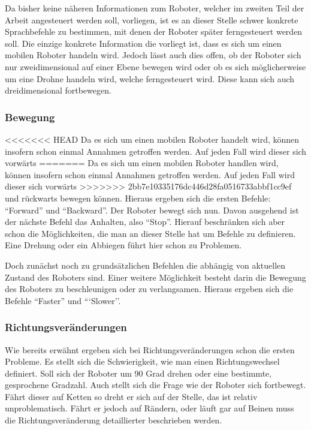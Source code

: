 Da bisher keine n\"aheren Informationen zum Roboter, welcher im zweiten Teil der Arbeit angesteuert werden soll, vorliegen, ist es an dieser Stelle schwer 
konkrete Sprachbefehle zu bestimmen, mit denen der Roboter sp\"ater ferngesteuert werden soll.
Die einzige konkrete Information die vorliegt ist, dass es sich um einen mobilen Roboter handeln wird. 
Jedoch l\"asst auch dies offen, ob der Roboter sich nur zweidimensional auf einer Ebene bewegen wird oder ob es sich m\"oglicherweise um eine Drohne 
handeln wird, welche ferngesteuert wird. Diese kann sich auch dreidimensional fortbewegen.
\par\smallskip 

\subsubsection{Bewegung}

<<<<<<< HEAD
Da es sich um einen mobilen Roboter handelt wird, k\"onnen insofern schon einmal Annahmen getroffen werden. Auf jeden Fall wird dieser sich vorw\"arts 
=======
Da es sich um einen mobilen Roboter handlen wird, k\"onnen insofern schon einmal Annahmen getroffen werden. Auf jeden Fall wird dieser sich vorw\"arts 
>>>>>>> 2bb7e10335176dc446d28fa0516733abbf1cc9ef
und r\"uckwarts bewegen k\"onnen. Hieraus ergeben sich die ersten Befehle: ``Forward'' und ``Backward''. Der Roboter bewegt sich nun. Davon ausgehend 
ist der n\"achste Befehl das Anhalten, also ``Stop''. Hierauf beschr\"anken sich aber schon die M\"oglichkeiten, die man an dieser Stelle hat um 
Befehle zu definieren. Eine Drehung oder ein Abbiegen f\"uhrt hier schon zu Problemen. 

Doch zun\"achst noch zu grunds\"atzlichen Befehlen die abh\"angig von aktuellen Zustand des Roboters sind. Einer weitere M\"oglichkeit besteht 
darin die Bewegung des Roboters zu beschleunigen oder zu verlangsamen. Hieraus ergeben sich die Befehle ``Faster'' und ```Slower''.


\subsubsection{Richtungsver\"anderungen}

Wie bereits erw\"ahnt ergeben sich bei Richtungsver\"anderungen schon die ersten Probleme. Es stellt sich die Schwierigkeit, wie man einen 
Richtungswechsel definiert. Soll sich der Roboter um 90 Grad drehen oder eine bestimmte, gesprochene Gradzahl. Auch stellt sich die Frage wie 
der Roboter sich fortbewegt. F\"ahrt dieser auf Ketten so dreht er sich auf der Stelle, das ist relativ unproblematisch. F\"ahrt er jedoch 
auf R\"andern, oder l\"auft gar auf Beinen muss die Richtungsver\"anderung detaillierter beschrieben werden. 

